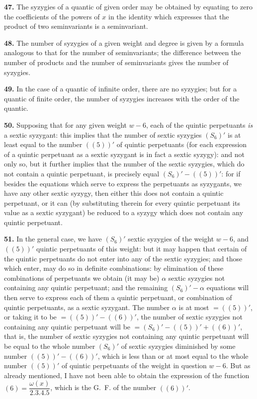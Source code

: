 \documentclass[11pt,a4paper]{book}
\begin{document}
\noindent\textbf{47.} The syzygies of a quantic of given order may be obtained by equating to zero the coefficients of the powers of $x$ in the identity which expresses that the product of two seminvariants is a seminvariant.

\noindent\textbf{48.} The number of syzygies of a given weight and degree is given by a formula analogous to that for the number of seminvariants; the difference between the number of products and the number of seminvariants gives the number of syzygies.

\noindent\textbf{49.} In the case of a quantic of infinite order, there are no syzygies; but for a quantic of finite order, the number of syzygies increases with the order of the quantic.

\noindent\textbf{50.} Supposing that for any given weight $w - 6$, each of the quintic perpetuants \textit{is} a sextic syzygant: this implies that the number of sextic syzygies $(S_6)'$ is at least equal to the number $((5))'$ of quintic perpetuants (for each expression of a quintic perpetuant as a sextic syzygant is in fact a sextic syzygy): and not only so, but it further implies that the number of the sextic syzygies, which do not contain a quintic perpetuant, is precisely equal $(S_6)' - ((5))'$: for if besides the equations which serve to express the perpetuants as syzygants, we have any other sextic syzygy, then either this does not contain a quintic perpetuant, or it can (by substituting therein for every quintic perpetuant its value as a sextic syzygant) be reduced to a syzygy which does not contain any quintic perpetuant.

\noindent\textbf{51.} In the general case, we have $(S_6)'$ sextic syzygies of the weight $w - 6$, and $((5))'$ quintic perpetuants of this weight: but it may happen that certain of the quintic perpetuants do not enter into any of the sextic syzygies; and those which enter, may do so in definite combinations: by elimination of these combinations of perpetuants we obtain (it may be) $\alpha$ sextic syzygies not containing any quintic perpetuant; and the remaining $(S_6)' - \alpha$ equations will then serve to express each of them a quintic perpetuant, or combination of quintic perpetuants, as a sextic syzygant. The number $\alpha$ is at most $= ((5))'$, or taking it to be $= ((5))' - ((6))'$, the number of sextic syzygies not containing any quintic perpetuant will be $= (S_6)' - ((5))' + ((6))'$, that is, the number of sextic syzygies not containing any quintic perpetuant will be equal to the whole number $(S_6)'$ of sextic syzygies diminished by some number $((5))' - ((6))'$, which is less than or at most equal to the whole number $((5))'$ of quintic perpetuants of the weight in question $w - 6$. But as already mentioned, I have not been able to obtain the expression of the function $(6) = \dfrac{\omega(x)}{2.3.4.5}$, which is the G.~F. of the number $((6))'$.
\end{document}
